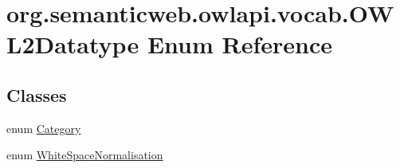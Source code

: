 \hypertarget{enumorg_1_1semanticweb_1_1owlapi_1_1vocab_1_1_o_w_l2_datatype}{\section{org.\-semanticweb.\-owlapi.\-vocab.\-O\-W\-L2\-Datatype Enum Reference}
\label{enumorg_1_1semanticweb_1_1owlapi_1_1vocab_1_1_o_w_l2_datatype}
}
\subsection*{Classes}
\begin{DoxyCompactItemize}
\item 
enum \hyperlink{enumorg_1_1semanticweb_1_1owlapi_1_1vocab_1_1_o_w_l2_datatype_1_1_category}{Category}
\item 
enum \hyperlink{enumorg_1_1semanticweb_1_1owlapi_1_1vocab_1_1_o_w_l2_datatype_1_1_white_space_normalisation}{White\-Space\-Normalisation}
\end{DoxyCompactItemize}
